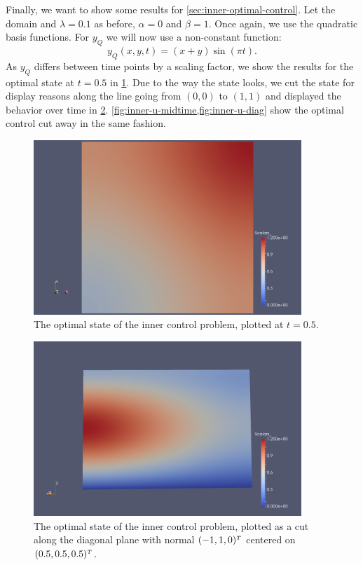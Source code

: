 \documentclass[../thesis.tex]{subfiles}
\begin{document}
Finally, we want to show some results for \cref{sec:inner-optimal-control}.
Let the domain and $\lambda = 0.1$ as before, $\alpha = 0$ and $\beta = 1$. Once again, we use the quadratic basis functions.
For $y_Q$ we will now use a non-constant function:
\[
	y_Q(x, y, t) = (x + y) \sin(\pi t).
\]
As $y_Q$ differs between time points by a scaling factor, we show the results for the optimal state at $t = 0.5$ in \cref{fig:inner-y-midtime}.
Due to the way the state looks, we cut the state for display reasons along the line going from $(0, 0)$ to $(1, 1)$ and displayed the behavior over time in \cref{fig:inner-y-diag}.
\cref{fig:inner-u-midtime,fig:inner-u-diag} show the optimal control cut away in the same fashion.
\begin{figure}[htpb]
\centering
\includegraphics[width=0.9\textwidth]{Images/inner-y-cut-midtime.png}
\caption{The optimal state of the inner control problem, plotted at $t = 0.5$.}
\label{fig:inner-y-midtime}
\end{figure}
\begin{figure}[htpb]
\centering
\includegraphics[width=0.9\textwidth]{Images/inner-y-cut-diag.png}
\caption{The optimal state of the inner control problem, plotted as a cut along the diagonal plane with normal $(-1, 1, 0)^\tp$ centered on $(0.5, 0.5, 0.5)^\tp$.}
\label{fig:inner-y-diag}
\end{figure}
\end{document}
